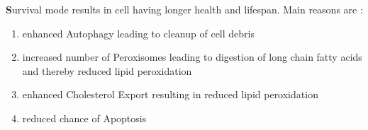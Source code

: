 \textbf Survival mode results in cell having longer health and lifespan. Main reasons are :
\begin{enumerate}
\item enhanced Autophagy leading to cleanup of cell debris
\item increased number of Peroxisomes leading to digestion of long chain fatty acids and thereby reduced lipid peroxidation
\item enhanced Cholesterol Export resulting in reduced lipid peroxidation
\item reduced chance of Apoptosis
\end{enumerate}